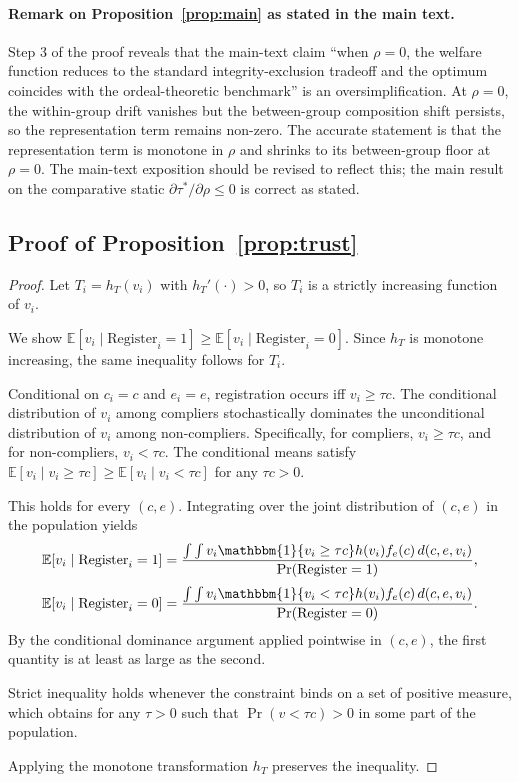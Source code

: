 \paragraph{Remark on Proposition~\ref{prop:main} as stated in the main text.} Step 3 of the proof reveals that the main-text claim ``when $\rho = 0$, the welfare function reduces to the standard integrity-exclusion tradeoff and the optimum coincides with the ordeal-theoretic benchmark'' is an oversimplification. At $\rho = 0$, the within-group drift vanishes but the between-group composition shift persists, so the representation term remains non-zero. The accurate statement is that the representation term is monotone in $\rho$ and shrinks to its between-group floor at $\rho = 0$. The main-text exposition should be revised to reflect this; the main result on the comparative static $\partial \tau^*/\partial \rho \leq 0$ is correct as stated.

\subsection{Proof of Proposition~\ref{prop:trust}}
\label{ssec:proof_trust}

\begin{proof}
Let $T_i = h_T(v_i)$ with $h_T'(\cdot) > 0$, so $T_i$ is a strictly increasing function of $v_i$.

We show $\mathbb{E}[v_i \mid \text{Register}_i = 1] \geq \mathbb{E}[v_i \mid \text{Register}_i = 0]$. Since $h_T$ is monotone increasing, the same inequality follows for $T_i$.

Conditional on $c_i = c$ and $e_i = e$, registration occurs iff $v_i \geq \tau c$. The conditional distribution of $v_i$ among compliers stochastically dominates the unconditional distribution of $v_i$ among non-compliers. Specifically, for compliers, $v_i \geq \tau c$, and for non-compliers, $v_i < \tau c$. The conditional means satisfy $\mathbb{E}[v_i \mid v_i \geq \tau c] \geq \mathbb{E}[v_i \mid v_i < \tau c]$ for any $\tau c > 0$.

This holds for every $(c, e)$. Integrating over the joint distribution of $(c, e)$ in the population yields
\[
\mathbb{E}[v_i \mid \text{Register}_i = 1] = \frac{\int \int v_i \mathbbm{1}\{v_i \geq \tau c\} h(v_i) f_e(c) \, d(c, e, v_i)}{\Pr(\text{Register} = 1)},
\]
\[
\mathbb{E}[v_i \mid \text{Register}_i = 0] = \frac{\int \int v_i \mathbbm{1}\{v_i < \tau c\} h(v_i) f_e(c) \, d(c, e, v_i)}{\Pr(\text{Register} = 0)}.
\]
By the conditional dominance argument applied pointwise in $(c, e)$, the first quantity is at least as large as the second.

Strict inequality holds whenever the constraint binds on a set of positive measure, which obtains for any $\tau > 0$ such that $\Pr(v < \tau c) > 0$ in some part of the population.

Applying the monotone transformation $h_T$ preserves the inequality.
\end{proof}

